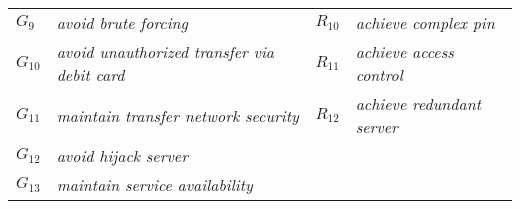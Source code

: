 {\begin{tabular}{llll}
	\\
	\cellcolor{blue!10}$G_{9}$ &
	\cellcolor{blue!10}\textit{avoid brute forcing} &
	\multicolumn{1}{l}{\cellcolor{green!10}$R_{10}$} &
	\cellcolor{green!10}\textit{achieve complex pin}
	\\
	\cellcolor{blue!10}$G_{10}$ &
	\cellcolor{blue!10}\textit{avoid unauthorized transfer via debit card} &
	\multicolumn{1}{l}{\cellcolor{green!10}$R_{11}$} &
	\cellcolor{green!10}\textit{achieve access control}
	\\
	\cellcolor{blue!10}$G_{11}$ &
	\cellcolor{blue!10}\textit{maintain transfer network security} &
	\multicolumn{1}{l}{\cellcolor{green!10}$R_{12}$} &
	\cellcolor{green!10}\textit{achieve redundant server}
	\\
	\cellcolor{blue!10}$G_{12}$ &
	\cellcolor{blue!10}\textit{avoid hijack server} &
	\multicolumn{1}{l}{\cellcolor{green!10}\textit{}} &
	\cellcolor{green!10}\textit{}
	\\
	\cellcolor{blue!10}$G_{13}$ &
	\cellcolor{blue!10}\textit{maintain service availability} &
	\multicolumn{1}{l}{\cellcolor{green!10}\textit{}} &
	\cellcolor{green!10}\textit{}
	\bigstrut[b]\\
	\bottomrule[1.5pt]
\end{tabular}}%

